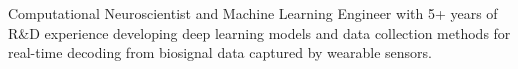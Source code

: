 \documentclass[letterpaper,10pt]{article}
\begin{document}


\vspace{-2pt}
\small{Computational Neuroscientist and Machine Learning Engineer with 5+ years of R\&D experience developing deep learning models and data collection methods for real-time decoding from biosignal data captured by wearable sensors.}
\vspace{4pt}










\end{document}
